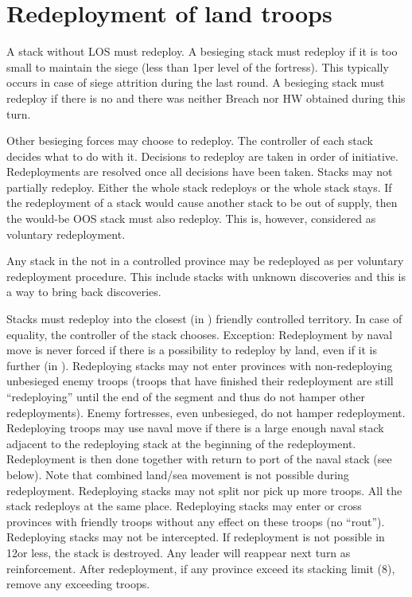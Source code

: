 \section{Redeployment of land troops}\label{chRedep:Redeployment}
\bparag A stack without LOS must redeploy.
\bparag A besieging stack must redeploy if it is too small to maintain the
siege (less than 1\LD per level of the fortress). This typically occurs in
case of siege attrition during the last round.
\bparag A besieging stack must redeploy if there is no \USURE\Faceplus and
there was neither Breach nor HW obtained during this turn.

\bparag Other besieging forces may choose to redeploy. The controller of each
stack decides what to do with it.
\bparag Decisions to redeploy are taken in order of initiative. Redeployments
are resolved once all decisions have been taken.
\bparag Stacks may not partially redeploy. Either the whole stack redeploys or
the whole stack stays.
\bparag If the redeployment of a stack would cause another stack to be out of
supply, then the would-be OOS stack must also redeploy. This is, however,
considered as voluntary redeployment.

\bparag Any stack in the \ROTW not in a controlled province may be redeployed
as per voluntary redeployment procedure.
\bparag This include stacks with unknown discoveries and this is a way to
bring back discoveries.

\bparag Stacks must redeploy into the closest (in \MP) friendly controlled
territory. In case of equality, the controller of the stack chooses.
\bparag Exception: Redeployment by naval move is never forced if there is a
possibility to redeploy by land, even if it is further (in \MP).
\bparag Redeploying stacks may not enter provinces with non-redeploying
unbesieged enemy troops (troops that have finished their redeployment are
still ``redeploying'' until the end of the segment and thus do not hamper
other redeployments). Enemy fortresses, even unbesieged, do not hamper
redeployment.
\bparag Redeploying troops may use naval move if there is a large enough naval
stack adjacent to the redeploying stack at the beginning of the
redeployment. Redeployment is then done together with return to port of the
naval stack (see below). Note that combined land/sea movement is not possible
during redeployment.
\bparag Redeploying stacks may not split nor pick up more troops. All the
stack redeploys at the same place.
\bparag Redeploying stacks may enter or cross provinces with friendly troops
without any effect on these troops (no ``rout'').
\bparag Redeploying stacks may not be intercepted.
\bparag If redeployment is not possible in 12\MP or less, the stack is
destroyed. Any leader will reappear next turn as reinforcement.
\bparag After redeployment, if any province exceed its stacking limit (8\LD),
remove any exceeding troops.

